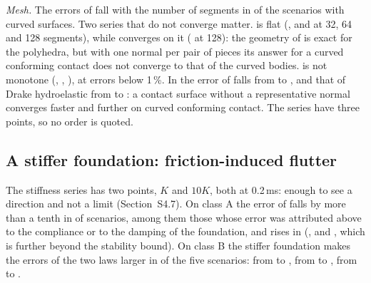 \emph{Mesh.} The errors of  fall with the number of segments in
 of the  scenarios
with curved surfaces. Two series that do not converge matter.  is flat
(,  and
 at 32, 64 and 128 segments), while  converges
on it ( at 128): the geometry of  is exact for
the polyhedra, but with one normal per pair of pieces its answer for a curved conforming
contact does not converge to that of the curved bodies.  is not monotone
(, ,
), at errors below 1\,\%. In  the error of
 falls from  to
, and that of Drake hydroelastic from
 to : a contact surface
without a representative normal converges faster and further on curved conforming contact. The
series have three points, so no order is quoted.

\subsection{A stiffer foundation: friction-induced flutter}\label{sec:stiffness}

The stiffness series has two points, $K$ and $10K$, both at 0.2\,ms: enough to see a direction
and not a limit (Section~S4.7). On class A the error of  falls by more than a
tenth in  of  scenarios, among
them those whose error was attributed above to the compliance or to the damping of the
foundation, and
rises in  (, and , which is
further beyond the stability bound). On class B the stiffer foundation makes the errors of the
two laws larger in  of the five scenarios:  from
 to ,  from
 to ,  from
 to .

